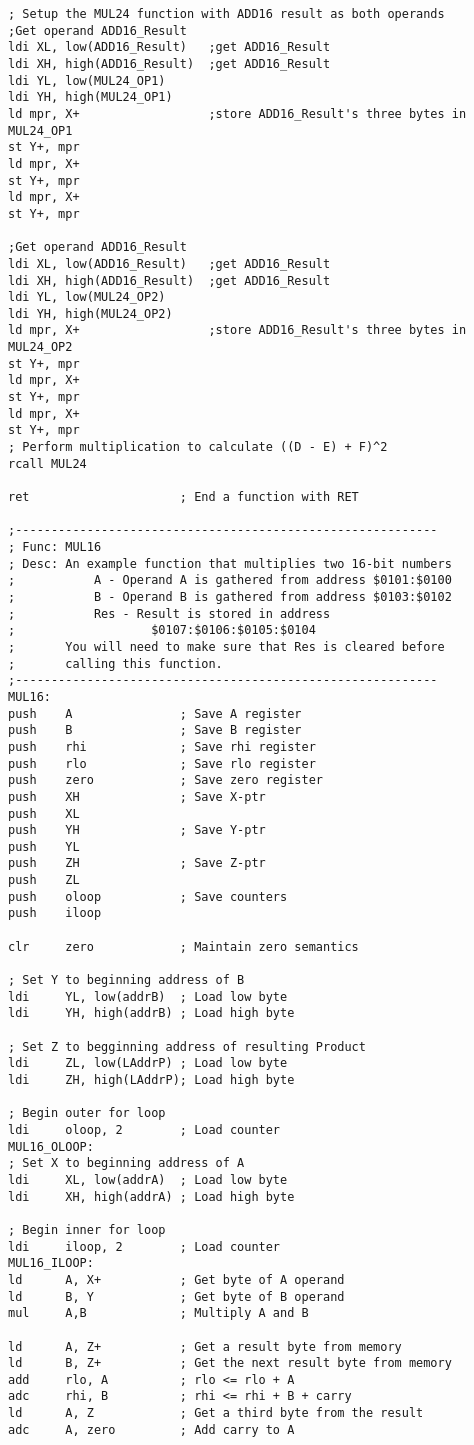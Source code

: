 \documentclass[12pt,letterpaper]{article}
\begin{document}
\begin{verbatim}
; Setup the MUL24 function with ADD16 result as both operands
;Get operand ADD16_Result
ldi XL, low(ADD16_Result)	;get ADD16_Result
ldi XH, high(ADD16_Result)	;get ADD16_Result
ldi YL, low(MUL24_OP1)
ldi YH, high(MUL24_OP1)
ld mpr, X+					;store ADD16_Result's three bytes in MUL24_OP1
st Y+, mpr
ld mpr, X+
st Y+, mpr	
ld mpr, X+
st Y+, mpr	

;Get operand ADD16_Result
ldi XL, low(ADD16_Result)	;get ADD16_Result
ldi XH, high(ADD16_Result)	;get ADD16_Result
ldi YL, low(MUL24_OP2)
ldi YH, high(MUL24_OP2)
ld mpr, X+					;store ADD16_Result's three bytes in MUL24_OP2
st Y+, mpr
ld mpr, X+
st Y+, mpr	
ld mpr, X+
st Y+, mpr		
; Perform multiplication to calculate ((D - E) + F)^2
rcall MUL24

ret						; End a function with RET

;-----------------------------------------------------------
; Func: MUL16
; Desc: An example function that multiplies two 16-bit numbers
;			A - Operand A is gathered from address $0101:$0100
;			B - Operand B is gathered from address $0103:$0102
;			Res - Result is stored in address 
;					$0107:$0106:$0105:$0104
;		You will need to make sure that Res is cleared before
;		calling this function.
;-----------------------------------------------------------
MUL16:
push 	A				; Save A register
push	B				; Save B register
push	rhi				; Save rhi register
push	rlo				; Save rlo register
push	zero			; Save zero register
push	XH				; Save X-ptr
push	XL
push	YH				; Save Y-ptr
push	YL				
push	ZH				; Save Z-ptr
push	ZL
push	oloop			; Save counters
push	iloop				

clr		zero			; Maintain zero semantics

; Set Y to beginning address of B
ldi		YL, low(addrB)	; Load low byte
ldi		YH, high(addrB)	; Load high byte

; Set Z to begginning address of resulting Product
ldi		ZL, low(LAddrP)	; Load low byte
ldi		ZH, high(LAddrP); Load high byte

; Begin outer for loop
ldi		oloop, 2		; Load counter
MUL16_OLOOP:
; Set X to beginning address of A
ldi		XL, low(addrA)	; Load low byte
ldi		XH, high(addrA)	; Load high byte

; Begin inner for loop
ldi		iloop, 2		; Load counter
MUL16_ILOOP:
ld		A, X+			; Get byte of A operand
ld		B, Y			; Get byte of B operand
mul		A,B				; Multiply A and B

ld		A, Z+			; Get a result byte from memory
ld		B, Z+			; Get the next result byte from memory
add		rlo, A			; rlo <= rlo + A
adc		rhi, B			; rhi <= rhi + B + carry
ld		A, Z			; Get a third byte from the result
adc		A, zero			; Add carry to A


\end{verbatim}
\end{document}
